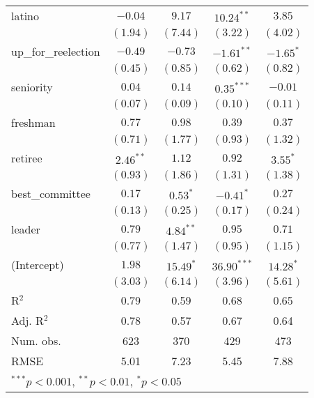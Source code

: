 \documentclass[12pt]{article}
\begin{document}
\begin{table}[H]
\begin{center}
\begin{tabular}{l c c c c }
			latino                 & $-0.04$       & $9.17$        & $10.24^{**}$   & $3.85$        \\
			& $(1.94)$      & $(7.44)$      & $(3.22)$       & $(4.02)$      \\
			up\_for\_reelection    & $-0.49$       & $-0.73$       & $-1.61^{**}$   & $-1.65^{*}$   \\
			& $(0.45)$      & $(0.85)$      & $(0.62)$       & $(0.82)$      \\
			seniority              & $0.04$        & $0.14$        & $0.35^{***}$   & $-0.01$       \\
			& $(0.07)$      & $(0.09)$      & $(0.10)$       & $(0.11)$      \\
			freshman               & $0.77$        & $0.98$        & $0.39$         & $0.37$        \\
			& $(0.71)$      & $(1.77)$      & $(0.93)$       & $(1.32)$      \\
			retiree                & $2.46^{**}$   & $1.12$        & $0.92$         & $3.55^{*}$    \\
			& $(0.93)$      & $(1.86)$      & $(1.31)$       & $(1.38)$      \\
			best\_committee        & $0.17$        & $0.53^{*}$    & $-0.41^{*}$    & $0.27$        \\
			& $(0.13)$      & $(0.25)$      & $(0.17)$       & $(0.24)$      \\
			leader                 & $0.79$        & $4.84^{**}$   & $0.95$         & $0.71$        \\
			& $(0.77)$      & $(1.47)$      & $(0.95)$       & $(1.15)$      \\
			(Intercept)            & $1.98$        & $15.49^{*}$   & $36.90^{***}$  & $14.28^{*}$   \\
			& $(3.03)$      & $(6.14)$      & $(3.96)$       & $(5.61)$      \\
			\hline
			R$^2$                  & 0.79          & 0.59          & 0.68           & 0.65          \\
			Adj. R$^2$             & 0.78          & 0.57          & 0.67           & 0.64          \\
			Num. obs.              & 623           & 370           & 429            & 473           \\
			RMSE                   & 5.01          & 7.23          & 5.45           & 7.88          \\
			\hline
			\multicolumn{5}{l}{\scriptsize{$^{***}p<0.001$, $^{**}p<0.01$, $^*p<0.05$}}
		\end{tabular}
	\end{center}
\end{table}
	
\end{document}
